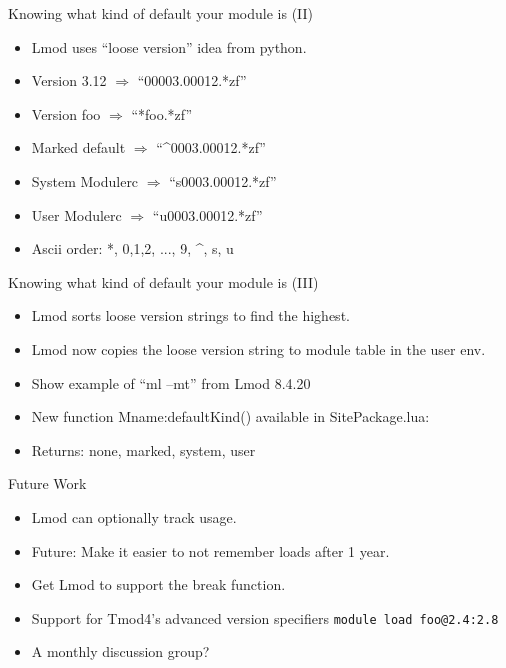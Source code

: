 \documentclass{beamer}
\begin{document}
\begin{frame}{Knowing what kind of default your module is (II)}
  \begin{itemize}
    \item Lmod uses ``loose version'' idea from python.
    \item Version 3.12 $\Rightarrow$ ``00003.00012.*zf''
    \item Version foo $\Rightarrow$ ``*foo.*zf''
    \item Marked default $\Rightarrow$ ``\^{}0003.00012.*zf''
    \item System Modulerc $\Rightarrow$ ``s0003.00012.*zf''
    \item User Modulerc $\Rightarrow$ ``u0003.00012.*zf''
    \item Ascii order: *, 0,1,2, ..., 9, \^{}, s, u
  \end{itemize}
\end{frame}

\begin{frame}{Knowing what kind of default your module is (III)}
  \begin{itemize}
    \item Lmod sorts loose version strings to find the highest.
    \item Lmod now copies the loose version string to module table in the
      user env.
    \item Show example of ``ml --mt'' from Lmod 8.4.20
    \item New function Mname:defaultKind() available in SitePackage.lua:
    \item Returns: none, marked, system, user
  \end{itemize}
\end{frame}

\begin{frame}{Future Work}
  \begin{itemize}
    \item Lmod can optionally track usage.
    \item Future: Make it easier to not remember loads after 1 year.
    \item Get Lmod to support the break function.
    \item Support for Tmod4's advanced version specifiers
      \texttt{module load foo@2.4:2.8}
    \item A monthly discussion group?
  \end{itemize}
\end{frame}
\end{document}
